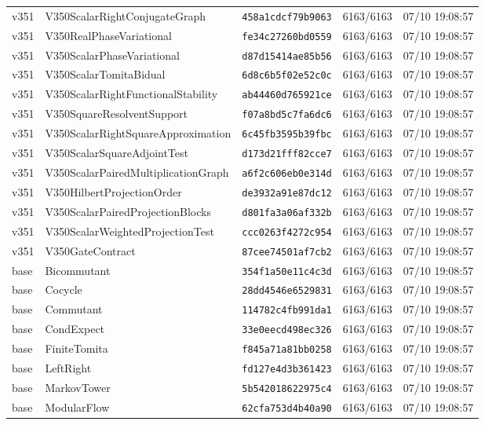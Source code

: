 \documentclass[11pt]{article}
\theoremstyle{definition}\newtheorem{deriv}{Derivação}
\begin{document}
{\begin{longtable}{@{}lllll@{}}
v351 & V350ScalarRightConjugateGraph & \texttt{458a1cdcf79b9063} & 6163/6163 & 07/10 19:08:57 \\
v351 & V350RealPhaseVariational & \texttt{fe34c27260bd0559} & 6163/6163 & 07/10 19:08:57 \\
v351 & V350ScalarPhaseVariational & \texttt{d87d15414ae85b56} & 6163/6163 & 07/10 19:08:57 \\
v351 & V350ScalarTomitaBidual & \texttt{6d8c6b5f02e52c0c} & 6163/6163 & 07/10 19:08:57 \\
v351 & V350ScalarRightFunctionalStability & \texttt{ab44460d765921ce} & 6163/6163 & 07/10 19:08:57 \\
v351 & V350SquareResolventSupport & \texttt{f07a8bd5c7fa6dc6} & 6163/6163 & 07/10 19:08:57 \\
v351 & V350ScalarRightSquareApproximation & \texttt{6c45fb3595b39fbc} & 6163/6163 & 07/10 19:08:57 \\
v351 & V350ScalarSquareAdjointTest & \texttt{d173d21fff82cce7} & 6163/6163 & 07/10 19:08:57 \\
v351 & V350ScalarPairedMultiplicationGraph & \texttt{a6f2c606eb0e314d} & 6163/6163 & 07/10 19:08:57 \\
v351 & V350HilbertProjectionOrder & \texttt{de3932a91e87dc12} & 6163/6163 & 07/10 19:08:57 \\
v351 & V350ScalarPairedProjectionBlocks & \texttt{d801fa3a06af332b} & 6163/6163 & 07/10 19:08:57 \\
v351 & V350ScalarWeightedProjectionTest & \texttt{ccc0263f4272c954} & 6163/6163 & 07/10 19:08:57 \\
v351 & V350GateContract & \texttt{87cee74501af7cb2} & 6163/6163 & 07/10 19:08:57 \\
base & Bicommutant & \texttt{354f1a50e11c4c3d} & 6163/6163 & 07/10 19:08:57 \\
base & Cocycle & \texttt{28dd4546e6529831} & 6163/6163 & 07/10 19:08:57 \\
base & Commutant & \texttt{114782c4fb991da1} & 6163/6163 & 07/10 19:08:57 \\
base & CondExpect & \texttt{33e0eecd498ec326} & 6163/6163 & 07/10 19:08:57 \\
base & FiniteTomita & \texttt{f845a71a81bb0258} & 6163/6163 & 07/10 19:08:57 \\
base & LeftRight & \texttt{fd127e4d3b361423} & 6163/6163 & 07/10 19:08:57 \\
base & MarkovTower & \texttt{5b542018622975c4} & 6163/6163 & 07/10 19:08:57 \\
base & ModularFlow & \texttt{62cfa753d4b40a90} & 6163/6163 & 07/10 19:08:57 \\

\end{longtable}}
\end{document}
